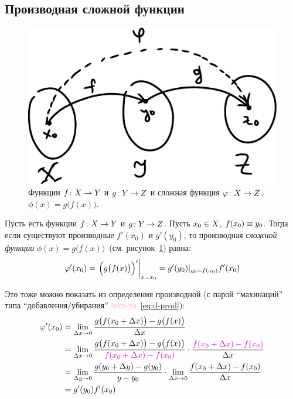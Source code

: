 \documentclass[a4paper,12pt]{article}
\begin{document}
  
  \subsection{Производная сложной функции}
  
  \begin{figure}[ht]
    \centering
    \includegraphics[width=0.6\linewidth]{images/X-Y-Z}
    
    \caption{
      Функции $f\colon X \hm\to Y$ и $g\colon Y \hm\to Z$ и сложная функция $\phi\colon X \hm\to Z$, $\phi(x) = g\bigl(f(x)\bigr)$.
    }
    \label{fig:x-y-z}
  \end{figure}
  
  Пусть есть функции $f\colon X \hm\to Y$ и $g\colon Y \hm\to Z$.
  Пусть $x_0 \hm\in X$, $f(x_0) \hm\equiv y_0$.
  Тогда если существуют производные $f'(x_0)$ и $g'(y_0)$, то производная \emph{сложной функции} $\phi(x) = g\bigl(f(x)\bigr)$~(см. рисунок~\ref{fig:x-y-z}) равна:
  \begin{equation}
    \phi'(x_0) = \left.\Bigl(g\bigl(f(x)\bigr)\Bigr)'\right|_{x = x_0} = g'(y_0)|_{y_0 = f(x_0)} f'(x_0)
  \end{equation}
  
  Это тоже можно показать из определения производной (с парой ``махинаций'' типа ``добавления/убирания'' \textcolor{pink}{чего-то}~\eqref{eq:d-prod}):
  \begin{equation*}
  \begin{split}
    \phi'(x_0) &= \lim_{\Dt x \to 0} \frac{g\bigl(f(x_0 + \Dt x)\bigr) - g\bigl(f(x)\bigr)}{\Dt x}\\
      &= \lim_{\Dt x \to 0} \frac{g\bigl(f(x_0 + \Dt x)\bigr) - g\bigl(f(x)\bigr)}{\textcolor{pink}{f(x_0 + \Dt x) - f(x_0)}} \cdot \frac{\textcolor{pink}{f(x_0 + \Dt x) - f(x_0)}}{\Dt x}\\
      &= \lim_{\Dt y \to 0} \frac{g(y_0 + \Dt y) - g(y_0)}{y - y_0} \cdot \lim_{\Dt x \to 0} \frac{f(x_0 + \Dt x) - f(x_0)}{\Dt x}\\
      &= g'(y_0) f'(x_0)
  \end{split}
  \end{equation*}
  
\end{document}
